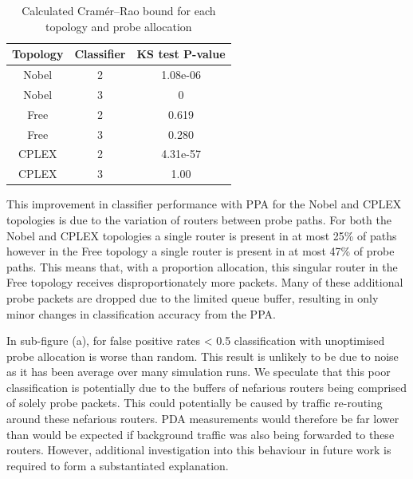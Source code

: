 \begin{table}[H]
 \centering
  \begin{tabular}{@{}ccc@{}}
   \toprule
    Topology & Classifier & KS test P-value \\
    \midrule
    Nobel & 2 & 1.08e-06\\
    Nobel & 3 & 0\\
    Free  & 2 & 0.619\\
    Free  & 3 & 0.280\\
    CPLEX & 2 & 4.31e-57\\
    CPLEX & 3 & 1.00\\
   \bottomrule
  \end{tabular}
  \caption{Calculated Cramér–Rao bound for each topology and probe allocation}
  \label{tbl:Roptkstest}
\end{table}
This improvement in classifier performance with PPA for the Nobel and CPLEX topologies is due to the variation of routers between probe paths. For both the Nobel and CPLEX topologies a single router is present in at most 25\% of paths however in the Free topology a single router is present in at most 47\% of probe paths. This means that, with a proportion allocation, this singular router in the Free topology receives disproportionately more packets. Many of these additional probe packets are dropped due to the limited queue buffer, resulting in only minor changes in classification accuracy from the PPA.\par
In sub-figure (a), for false positive rates < 0.5 classification with unoptimised probe allocation is worse than random. This result is unlikely to be due to noise as it has been average over many simulation runs. We speculate that this poor classification is potentially due to the buffers of nefarious routers being comprised of solely probe packets. This could potentially be caused by traffic re-routing around these nefarious routers. PDA measurements would therefore be far lower than would be expected if background traffic was also being forwarded to these routers. However, additional investigation into this behaviour in future work is required to form a substantiated explanation.

